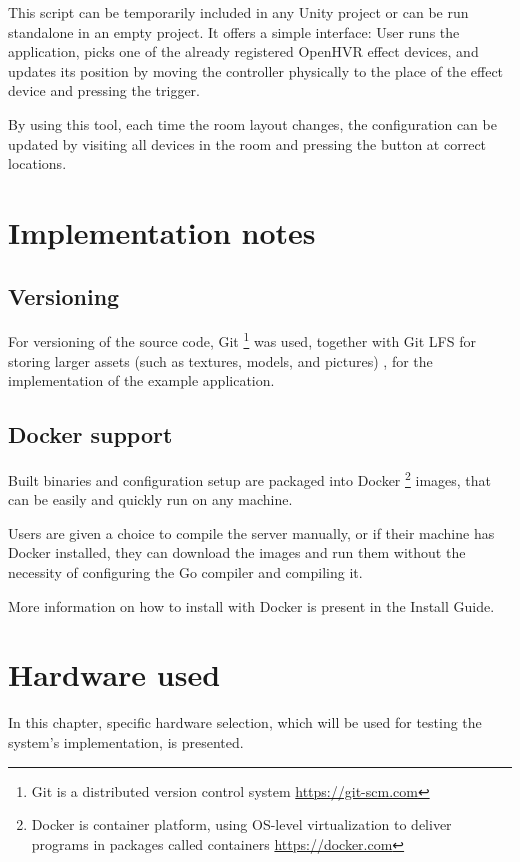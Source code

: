 This script can be temporarily included in any Unity project or can be run
standalone in an empty project. It offers a simple interface:
User runs the application, picks one of the already registered OpenHVR
effect devices, and updates its position by moving the controller physically
to the place of the effect device and pressing the trigger.


By using this tool, each time the room layout changes, the configuration can
be updated by visiting all devices in the room and pressing the button at
correct locations.


\hypertarget{x-implementation-notes}{\section{Implementation notes}}
\hypertarget{x-versioning}{\subsection{Versioning}}
For versioning of the source code, Git
\footnote{Git is a distributed version control system \href{https://git-scm.com}{https://git-scm.com}}
was used, together with Git LFS for
storing larger assets (such as textures, models, and pictures)
, for the implementation of the example application.


\hypertarget{x-docker-support}{\subsection{Docker support}}
Built binaries and configuration setup are packaged into Docker
\footnote{Docker is container platform, using OS-level virtualization to deliver programs in packages called containers \href{https://docker.com}{https://docker.com}}
images, that can be easily and quickly run on any machine.


Users are given a choice to compile the server manually, or if their machine has
Docker installed, they can download the images and run them without
the necessity of configuring the Go compiler and compiling it.

More information on how to install with Docker is present in the Install Guide.

\hypertarget{x-hardware-used}{\section{Hardware used}}
In this chapter, specific hardware selection, which will be used for testing the
system’s implementation, is presented.

